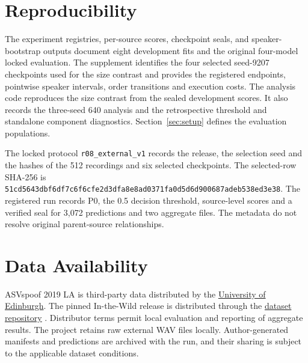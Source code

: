 









\section*{Reproducibility}

The experiment registries, per-source scores, checkpoint seals, and speaker-bootstrap outputs document eight development fits and the original four-model locked evaluation. The supplement identifies the four selected seed-9207 checkpoints used for the size contrast and provides the registered endpoints, pointwise speaker intervals, order transitions and execution costs. The analysis code reproduces the size contrast from the sealed development scores. It also records the three-seed 640 analysis and the retrospective threshold and standalone component diagnostics. Section~\ref{sec:setup} defines the evaluation populations.

The locked protocol \texttt{r08\_external\_v1} records the release, the selection seed and the hashes of the 512 recordings and six selected checkpoints. The selected-row SHA-256 is \texttt{51cd5643}\allowbreak \texttt{dbf6df7c}\allowbreak \texttt{6f6cfe2d}\allowbreak \texttt{3dfa8e8a}\allowbreak \texttt{d0371fa0}\allowbreak \texttt{d5d6d900}\allowbreak \texttt{687adeb5}\allowbreak \texttt{38ed3e38}. The registered run records P0, the 0.5 decision threshold, source-level scores and a verified seal for 3,072 predictions and two aggregate files. The metadata do not resolve original parent-source relationships.

\section*{Data Availability}
ASVspoof 2019 LA is third-party data distributed by the \href{https://doi.org/10.7488/ds/2555}{University of Edinburgh}. The pinned In-the-Wild release is distributed through the \href{https://huggingface.co/datasets/mueller91/In-The-Wild/tree/eee168f92c367f8c82ff2cf42b6f61e362fd6211}{dataset repository} \cite{wild}. Distributor terms permit local evaluation and reporting of aggregate results. The project retains raw external WAV files locally. Author-generated manifests and predictions are archived with the run, and their sharing is subject to the applicable dataset conditions.

